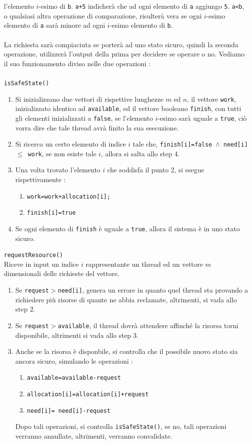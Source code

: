 \documentclass[12pt, letterpaper]{article}
\newcommand{\code}[1]{\colorbox{light-gray}{\texttt{#1}}}
\newcommand{\acc}{\\\hphantom{}\\}
\begin{document}
l'elemento \(i\)-esimo di \code{b}. \code{a+5} indicherà che ad ogni elemento di \code{a} aggiungo \code{5}.
\code{a<b}, o qualsiasi altra operazione di comparazione, risulterà vera se ogni \(i\)-esimo elemento di \code{a} sarà 
minore ad ogni \(i\)-esimo elemento di \code{b}.
\acc La richiesta sarà compiaciuta se porterà ad uno stato sicuro, quindi la seconda operazione, utilizzerà l'output 
della prima per decidere se operare o no. Vediamo il suo funzionamento diviso nelle due operazioni :\acc 
\code{isSafeState()} \begin{enumerate}
    \item Si inizializzano due vettori di rispettive lunghezze \(m\) ed \(n\), il vettore \code{work}, inizializzato 
    identico ad \code{available}, ed il vettore booleano \code{finish}, con tutti gli elementi inizializzati a \code{false}, se 
    l'elemento \(i\)-esimo sarà uguale a \code{true}, ciò vorra dire che tale thread avrà finito la sua esecuzione.
    \item Si ricerca un certo elemento di indice \(i\) tale che, \code{finish[i]=false \(\land\) need[i]\(\le\) work}, se 
    non esiste tale \(i\), allora si salta allo step 4.
    \item Una volta trovato l'elemento \(i\) che soddisfa il punto 2, si esegue rispettivamente : \begin{enumerate}
        \item \code{work=work+allocation[i];}
        \item \code{finish[i]=true}
    \end{enumerate}
    \item Se ogni elemento di \code{finish} è uguale a \code{true}, allora il sistema è in uno stato sicuro.
\end{enumerate}
\code{requestResource()} \\
Riceve in input un indice \(i\) rappresentante un thread ed un vettore \(m\) dimensionali delle richieste del vettore.
\begin{enumerate}
    \item Se \code{request\(>\)need[i]}, genera un errore in quanto quel thread sta provando a richiedere più risorse 
    di quante ne abbia reclamate, altrimenti, si vada allo step 2. 
    \item Se \code{request\(>\)available}, il thread dovrà attendere affinché la risorsa torni disponibile, altrimenti 
    si vada allo step 3. 
    \item Anche se la risorsa è disponbile, si controlla che il possibile nuovo stato sia ancora sicuro, simulando le 
    operazioni : \begin{enumerate}
        \item \code{available=available-request}
        \item \code{allocation[i]=allocation[i]+request}
        \item \code{need[i]= need[i]-request}
    \end{enumerate}
    Dopo tali operazioni, si controlla \code{isSafeState()}, se no, tali operazioni verranno annullate, altrimenti, 
    verranno convalidate.
\end{enumerate}
\end{document}
